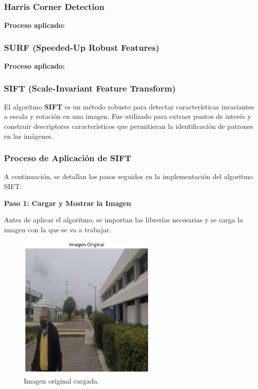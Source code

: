\documentclass[a4paper]{article}
\begin{document}
\subsubsection{Harris Corner Detection}


\textbf{Proceso aplicado:}


\subsubsection{SURF (Speeded-Up Robust Features)}


\textbf{Proceso aplicado:}


\subsubsection{SIFT (Scale-Invariant Feature Transform)}

El algoritmo \textbf{SIFT} es un método robusto para detectar características invariantes a escala y rotación en una imagen. Fue utilizado para extraer puntos de interés y construir descriptores característicos que permitieran la identificación de patrones en las imágenes.

\subsubsection{Proceso de Aplicación de SIFT}

A continuación, se detallan los pasos seguidos en la implementación del algoritmo SIFT:
\par\vspace{0.5cm}

\textbf{Paso 1: Cargar y Mostrar la Imagen}
\par\vspace{0.5cm}

Antes de aplicar el algoritmo, se importan las librerías necesarias y se carga la imagen con la que se va a trabajar.

\begin{figure}[H]
    \centering
    \includegraphics[width=0.6\textwidth]{images/sift_paso_1.png}
    \caption{Imagen original cargada.}
\end{figure}
\end{document}
